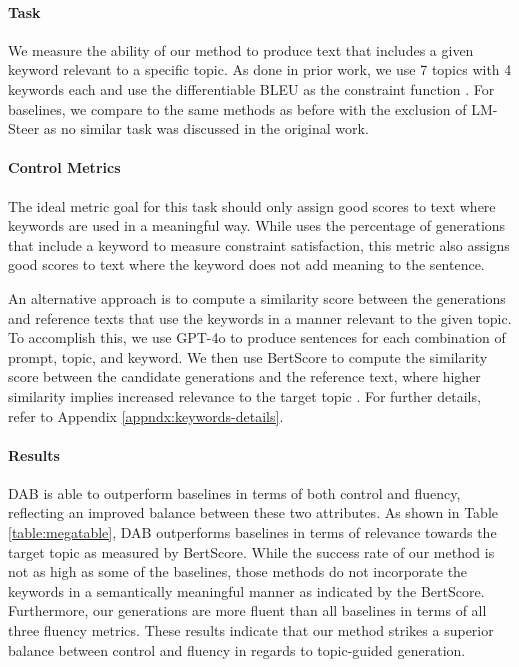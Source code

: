 \paragraph{Task} We measure the ability of our method to produce text that includes a given keyword relevant to a specific topic. As done in prior work, we use 7 topics with 4 keywords each and use the differentiable BLEU \citep{liu-etal-2022-dont} as the constraint function \citep{liu2023bolt}. For baselines, we compare to the same methods as before with the exclusion of LM-Steer as no similar task was discussed in the original work. 

\paragraph{Control Metrics} 
The ideal metric goal for this task should only assign good scores to text where keywords are used in a meaningful way. 
While \citet{liu2023bolt} uses the percentage of generations that include a keyword to measure constraint satisfaction, this metric also assigns good scores to text where the keyword does not add meaning to the sentence.

An alternative approach is to compute a similarity score between the generations and reference texts that use the keywords in a manner relevant to the given topic. 
To accomplish this, we use GPT-4o to produce sentences for each combination of prompt, topic, and keyword. 
We then use BertScore to compute the similarity score between the candidate generations and the reference text, where higher similarity implies increased relevance to the target topic \citep{zhang2020bertscoreevaluatingtextgeneration}. 
For further details, refer to Appendix \ref{appndx:keywords-details}. 

\paragraph{Results}
DAB is able to outperform baselines in terms of both control and fluency, reflecting an improved balance between these two attributes. As shown in Table \ref{table:megatable}, DAB outperforms baselines in terms of relevance towards the target topic as measured by BertScore. While the success rate of our method is not as high as some of the baselines, those methods do not incorporate the keywords in a semantically meaningful manner as indicated by the BertScore. Furthermore, our generations are more fluent than all baselines in terms of all three fluency metrics. These results indicate that our method strikes a superior balance between control and fluency in regards to topic-guided generation.  


